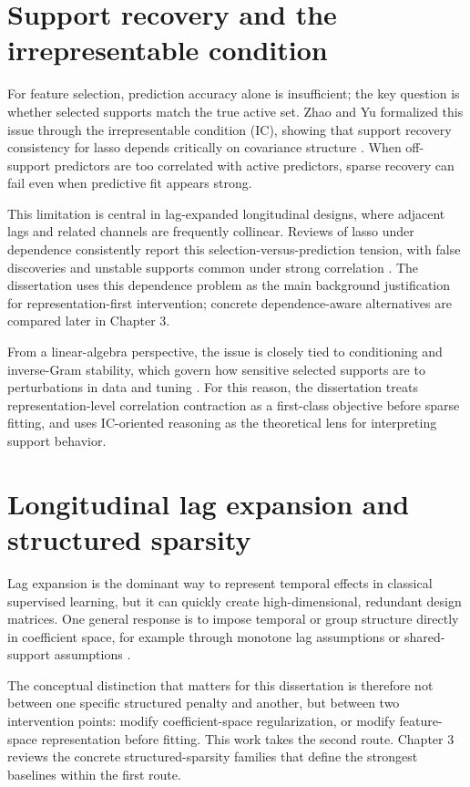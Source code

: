 \section{Support recovery and the irrepresentable condition}
For feature selection, prediction accuracy alone is insufficient; the key question is whether selected supports match the true active set. Zhao and Yu formalized this issue through the irrepresentable condition (IC), showing that support recovery consistency for lasso depends critically on covariance structure \autocite{PZhao2006model}. When off-support predictors are too correlated with active predictors, sparse recovery can fail even when predictive fit appears strong.

This limitation is central in lag-expanded longitudinal designs, where adjacent lags and related channels are frequently collinear. Reviews of lasso under dependence consistently report this selection-versus-prediction tension, with false discoveries and unstable supports common under strong correlation \autocite{freijeirogonzalez2022}. The dissertation uses this dependence problem as the main background justification for representation-first intervention; concrete dependence-aware alternatives are compared later in Chapter 3.

From a linear-algebra perspective, the issue is closely tied to conditioning and inverse-Gram stability, which govern how sensitive selected supports are to perturbations in data and tuning \autocite{RAHorn2012Matrix}. For this reason, the dissertation treats representation-level correlation contraction as a first-class objective before sparse fitting, and uses IC-oriented reasoning as the theoretical lens for interpreting support behavior.

\section{Longitudinal lag expansion and structured sparsity}
Lag expansion is the dominant way to represent temporal effects in classical supervised learning, but it can quickly create high-dimensional, redundant design matrices. One general response is to impose temporal or group structure directly in coefficient space, for example through monotone lag assumptions or shared-support assumptions \autocites{RTibshirani2016ordered,turlach2005}.

The conceptual distinction that matters for this dissertation is therefore not between one specific structured penalty and another, but between two intervention points: modify coefficient-space regularization, or modify feature-space representation before fitting. This work takes the second route. Chapter 3 reviews the concrete structured-sparsity families that define the strongest baselines within the first route.

